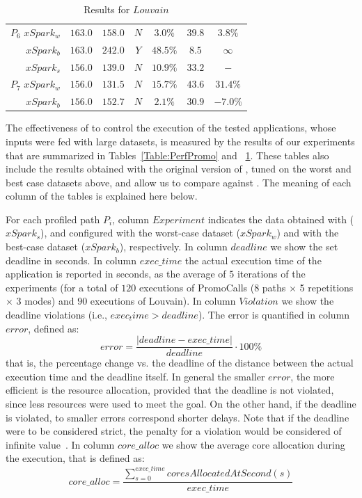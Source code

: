 \begin{table}[htbp]
\begin{tabular}{r|c|c|c|c|c|c}
		$P_6 \,\,xSpark_w$  & $163.0$   & $158.0$   & $N$   & $3.0\%$   & $39.8$   & $3.8\%$  \\
		$xSpark_b$  & $163.0$   & $242.0$   & $Y$   & $48.5\%$   & $8.5$   & $\infty$  \\
		\midrule
		$xSpark_s$  & $156.0$   & $139.0$   & $N$   & $10.9\%$   & $33.2$   & $-$  \\
		$P_7 \,\,xSpark_w$  & $156.0$   & $131.5$   & $N$   & $15.7\%$   & $43.6$   & $31.4\%$  \\
		$xSpark_b$  & $156.0$   & $152.7$   & $N$   & $2.1\%$   & $30.9$   & $-7.0\%$  \\
		\bottomrule
	\end{tabular}
	\caption{Results for $Louvain$}
	\label{Table:Louvain}
	\vspace{-8mm}
\end{table}

The effectiveness of \tool to control the execution of the tested applications, whose inputs were fed with large datasets, is measured by the results of our experiments that are summarized in Tables~\ref{Table:PerfPromo} and ~\ref{Table:Louvain}. These tables also include the results obtained with the original version of \cSpark, tuned on the worst and best case datasets above, and allow us to compare \tool against \cSpark. The meaning of each column of the tables is explained here below.

For each profiled path $P_i$, column $Experiment$ indicates the data obtained with \tool ($xSpark_s$), and \cSpark configured with the worst-case dataset ($xSpark_w$) and with the best-case dataset ($xSpark_b$), respectively. 
In column $deadline$ we show the set deadline in seconds. 
In column $exec\_time$ the actual execution time of the application is reported in seconds, as the average of $5$ iterations of the experiments (for a total of $120$ executions of PromoCalls (8 paths $\times$ 5 repetitions $\times$ 3 modes) and $90$ executions of Louvain). 
In column $Violation$ we show the deadline violations (i.e., $exec_time > deadline$). 
The error  is quantified in column $error$, defined as:
%
\[
error = \frac{|deadline - exec\_time|}{deadline}\cdot100\%
\]
%
that is, the percentage change vs. the deadline of the distance between the actual execution time and the deadline itself. In general the smaller $error$, the more efficient is the resource allocation, provided that the deadline is not violated, since less resources were used to meet the goal. On the other hand, if the deadline is violated, to smaller errors correspond shorter delays. Note that if the deadline were to be considered strict, the penalty for a violation would be considered of infinite value~\cite{shin1994real}.
In column $core\_alloc$ we show the average core allocation during the execution, that is defined as:
%
\[
core\_alloc = \frac{\sum_{s = 0}^{exec\_time} coresAllocatedAtSecond(s)}{exec\_time} 
\]
%

